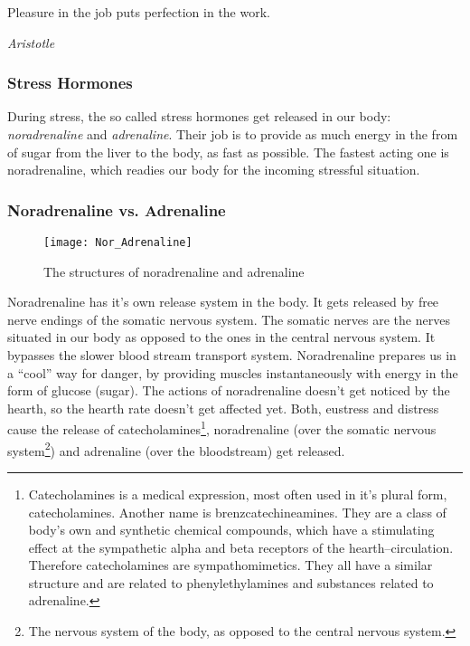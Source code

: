 \documentclass[../Book.Stress_regulation.tex]{subfiles}
\begin{document}
\epigraph{Pleasure in the job puts perfection in the work.}{\textit{Aristotle}}

\subsubsection{Stress Hormones}


During stress, the so called stress hormones get released in our body: \emph{noradrenaline} and \emph{adrenaline}.
Their job is to provide as much {energy} in the from of sugar from the liver to the body, as fast as possible.
The fastest acting one is noradrenaline, which readies our body for the incoming stressful situation.




\subsubsection{Noradrenaline vs. Adrenaline}

\begin{figure}[htb]
\texttt{[image: Nor\_Adrenaline]}
\caption{The structures of noradrenaline and adrenaline}
\end{figure}

Noradrenaline has it's {own release system} in the body. It gets released by free nerve endings of the somatic nervous system.
The somatic nerves are the nerves situated in our body as opposed to the ones in the central nervous system.
It bypasses the slower blood stream transport system.
Noradrenaline prepares us in a {``cool'' way} for danger, by providing muscles instantaneously with energy in the form of glucose (sugar).
The actions of noradrenaline doesn't get noticed by the hearth, so the hearth rate doesn't get affected yet.
Both, eustress and distress cause the release of catecholamines\footnote{Catecholamines is a medical expression, most often used in it's plural form, catecholamines. Another name is brenzcatechineamines. They are a class of body's own and synthetic chemical compounds, which have a stimulating effect at the sympathetic alpha and beta receptors of the hearth--circulation. Therefore catecholamines are sympathomimetics. They all have a similar structure and are related to phenylethylamines and substances related to adrenaline.}, noradrenaline (over the somatic nervous system\footnote{The nervous system of the body, as opposed to the central nervous system.}) and adrenaline (over the bloodstream) get released.
\end{document}
